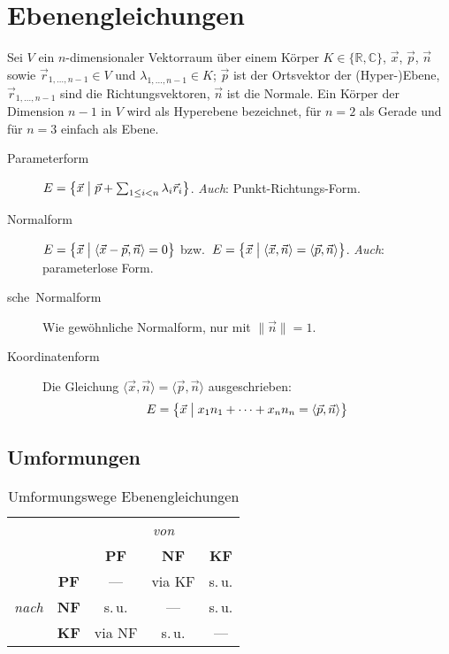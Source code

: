 \section{Ebenengleichungen}

Sei $V$ ein $n$-dimensionaler Vektorraum über einem Körper $K \in \{\mathbb R, \mathbb C\}$, $\vec x$, $\vec p$, $\vec n$ sowie $\vec r_{1,\ldots,n-1} \in V$ und $\lambda_{1,\ldots,n-1} \in K$; $\vec p$ ist der Ortsvektor der (Hyper-)Ebene, $\vec r_{1,\ldots,n-1}$ sind die Richtungsvektoren, $\vec n$ ist die Normale.
Ein Körper der Dimension $n-1$ in $V$ wird als Hyperebene bezeichnet, für $n=2$ als Gerade und für $n=3$ einfach als Ebene.

\begin{description}
  \item [Parameterform] 
	$E = \bigl\{ \vec x \bigm| \vec p + \sum_{1 \leq i < n} \lambda_i\vec r_i \bigr\}$.
	\emph{Auch}: Punkt-Richtungs-Form.
  \item [Normalform] 
	$E = \bigl\{ \vec x \bigm| \langle \vec x-\vec p, \vec n \rangle = 0 \bigr\}$
	bzw.~$E = \bigl\{ \vec x \bigm| \langle \vec x, \vec n \rangle = \langle \vec p, \vec n \rangle \bigr\} $.
	\emph{Auch}: parameterlose Form.
  \item [sche~Normalform] 
	Wie gewöhnliche Normalform, nur mit $\lVert\vec n\rVert=1$.
  \item [Koordinatenform] 
	Die Gleichung $\langle \vec{x},\vec{n}\rangle =\langle \vec{p},\vec{n}\rangle$ ausgeschrieben:
	\[ E = \bigl\{ \vec x \bigm| x_1 n_1 + \cdots + x_n n_n = \langle \vec{p},\vec{n}\rangle \bigr\} \]
\end{description}


\subsection{Umformungen}


\begin{table}[h]
\centering
\begin{tabular}{lcccc}
  && \multicolumn{3}{c}{\emph{von}} \\
  && \bfseries PF & \bfseries NF & \bfseries KF \\
  \multirow{3}{*}{\begin{sideways} \emph{nach} \end{sideways}}
    & \bfseries PF & --- & via KF & s.\,u. \\
    & \bfseries NF & s.\,u. & --- & s.\,u. \\
    & \bfseries KF & via NF & s.\,u. & --- \\
\end{tabular}
\caption{Umformungswege Ebenengleichungen}
\end{table}



